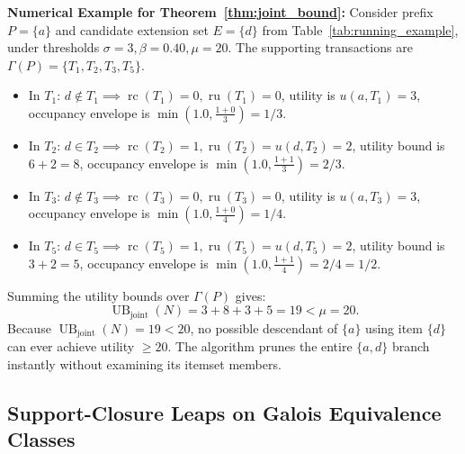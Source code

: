 \documentclass[runningheads]{llncs}
\newcommand{\UBjoint}{\operatorname{UB}_{\mathrm{joint}}}
\begin{document}
\noindent
\textbf{Numerical Example for Theorem~\ref{thm:joint_bound}:}
Consider prefix $P = \{a\}$ and candidate extension set $E = \{d\}$ from Table~\ref{tab:running_example}, under thresholds $\sigma = 3, \beta = 0.40, \mu = 20$.
The supporting transactions are $\Gamma(P) = \{T_1, T_2, T_3, T_5\}$.
\begin{itemize}
    \item In $T_1$: $d \notin T_1 \implies \operatorname{rc}(T_1)=0, \operatorname{ru}(T_1)=0$, utility is $u(a, T_1)=3$, occupancy envelope is $\min(1.0, \frac{1+0}{3}) = 1/3$.
    \item In $T_2$: $d \in T_2 \implies \operatorname{rc}(T_2)=1, \operatorname{ru}(T_2)=u(d, T_2)=2$, utility bound is $6+2=8$, occupancy envelope is $\min(1.0, \frac{1+1}{3}) = 2/3$.
    \item In $T_3$: $d \notin T_3 \implies \operatorname{rc}(T_3)=0, \operatorname{ru}(T_3)=0$, utility is $u(a, T_3)=3$, occupancy envelope is $\min(1.0, \frac{1+0}{4}) = 1/4$.
    \item In $T_5$: $d \in T_5 \implies \operatorname{rc}(T_5)=1, \operatorname{ru}(T_5)=u(d, T_5)=2$, utility bound is $3+2=5$, occupancy envelope is $\min(1.0, \frac{1+1}{4}) = 2/4 = 1/2$.
\end{itemize}
Summing the utility bounds over $\Gamma(P)$ gives:
\[
\UBjoint(N) = 3 + 8 + 3 + 5 = 19 < \mu = 20.
\]
Because $\UBjoint(N) = 19 < 20$, no possible descendant of $\{a\}$ using item $\{d\}$ can ever achieve utility $\ge 20$. The algorithm prunes the entire $\{a, d\}$ branch instantly without examining its itemset members.

\subsection{Support-Closure Leaps on Galois Equivalence Classes}
\end{document}
